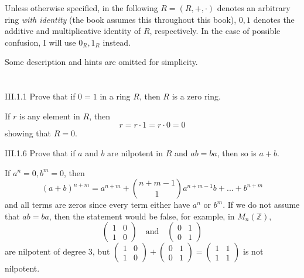 Unless otherwise specified, in the following $R = (R,+,\cdot)$ denotes an arbitrary ring \emph{with identity} (the book assumes this throughout this book), $0, 1$ denotes the additive and multiplicative identity of $R$, respectively. In the case of possible confusion, I will use $0_R, 1_R$ instead. 

Some description and hints are omitted for simplicity.

\section{}

\begin{problem}{III.1.1}
Prove that if $0 = 1$ in a ring $R$, then $R$ is a zero ring.
\end{problem}
\begin{pf}
If $r$ is any element in $R$, then
\[
r = r \cdot 1 = r \cdot 0 = 0  
\]
showing that $R = 0$.
\end{pf}
\begin{problem}{III.1.6}
Prove that if $a$ and $b$ are nilpotent in $R$ and $ab = ba$, then so is $a+b$.
\end{problem}
\begin{pf}
If $a^n = 0, b^m = 0$, then
\[
(a+b)^{n+m} = a^{n+m} +\binom{n+m-1}{1} a^{n+m-1}b + ... + b^{n+m}
\]
and all terms are zeros since every term either have $a^n$ or $b^m$. If we do not assume that $ab = ba$, then the statement would be false, for example, in $M_n(\mathbb{Z})$,
\[
\begin{pmatrix} 
1 & 0 \\
1 & 0
\end{pmatrix}
\quad \text{and} \quad
\begin{pmatrix} 
0 & 1 \\
0 & 1 
\end{pmatrix}
\]
are nilpotent of degree $3$, but
$\begin{pmatrix} 
1 & 0 \\
1 & 0
\end{pmatrix} + 
\begin{pmatrix} 
0 & 1 \\
0 & 1 
\end{pmatrix} = 
\begin{pmatrix} 
1 & 1 \\
1 & 1
\end{pmatrix}$ is not nilpotent.
\end{pf}

